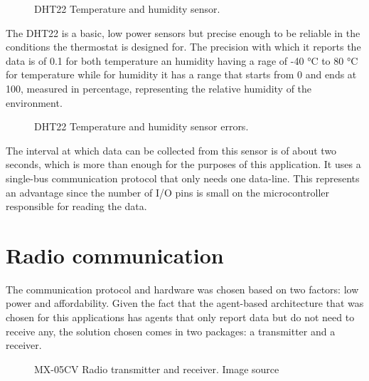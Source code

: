 \begin{figure}[h!]
    \label{fig:dht22}
    \centerline{}
    \caption[DHT22 Temperature and humidity sensor]{DHT22 Temperature and humidity sensor.}
    \label{fig:dht22}
\end{figure}

The DHT22 is a basic, low power sensors but precise enough to be reliable in the conditions the thermostat is
designed for. The precision with which it reports the data is of 0.1 for both temperature an humidity having a
 rage of -40 °C to 80 °C for temperature while for humidity it has a range that starts from 0 and ends at 100,
measured in percentage, representing the relative humidity of the environment.

\begin{figure}[h!]
    \label{fig:dht22_stats}
    \centerline{}
    \caption[DHT22 Temperature and humidity sensor errors]{DHT22 Temperature and humidity sensor errors.}
    \label{fig:dht22_stats}
\end{figure}

The interval at which data can be collected from this sensor is of about two seconds, which is more than
enough for the purposes of this application. It uses a single-bus communication protocol that only needs one
data-line. This represents an advantage since the number of I/O pins is small on the microcontroller
responsible for reading the data.

\section{Radio communication}
\label{sec:radiocomm}

The communication protocol and hardware was chosen based on two factors: low power and affordability.
Given the fact that the agent-based architecture that was chosen for this applications has agents that only
report data but do not need to receive any, the solution chosen comes in two packages: a transmitter and a
receiver.

\begin{figure}[h!]
    \label{fig:rf_tx_rx}
    \centerline{}
    \caption[MX-05CV Radio transmitter and receiver]{MX-05CV Radio transmitter and receiver. Image source
                                                     \cite{website:rf_tx_rx_img}}
    \label{fig:rf_tx_rx}
\end{figure}

